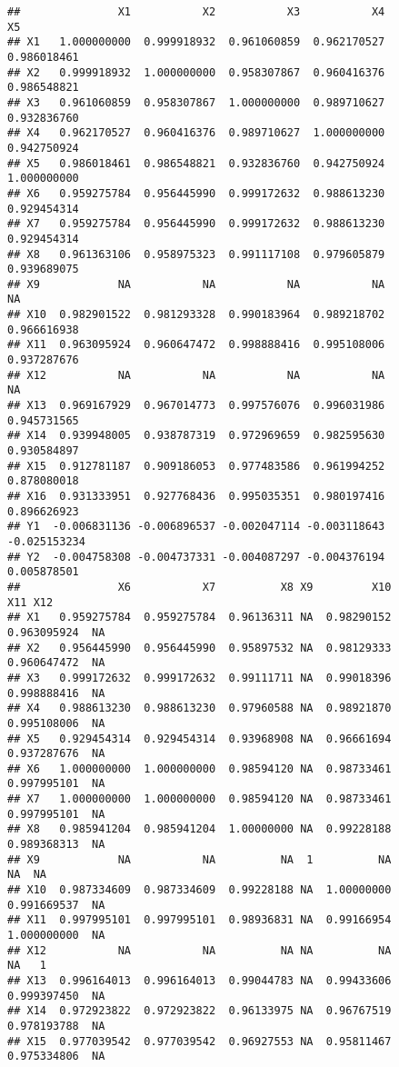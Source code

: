 \documentclass[
]{article}
\begin{document}
\begin{verbatim}
##               X1           X2           X3           X4           X5
## X1   1.000000000  0.999918932  0.961060859  0.962170527  0.986018461
## X2   0.999918932  1.000000000  0.958307867  0.960416376  0.986548821
## X3   0.961060859  0.958307867  1.000000000  0.989710627  0.932836760
## X4   0.962170527  0.960416376  0.989710627  1.000000000  0.942750924
## X5   0.986018461  0.986548821  0.932836760  0.942750924  1.000000000
## X6   0.959275784  0.956445990  0.999172632  0.988613230  0.929454314
## X7   0.959275784  0.956445990  0.999172632  0.988613230  0.929454314
## X8   0.961363106  0.958975323  0.991117108  0.979605879  0.939689075
## X9            NA           NA           NA           NA           NA
## X10  0.982901522  0.981293328  0.990183964  0.989218702  0.966616938
## X11  0.963095924  0.960647472  0.998888416  0.995108006  0.937287676
## X12           NA           NA           NA           NA           NA
## X13  0.969167929  0.967014773  0.997576076  0.996031986  0.945731565
## X14  0.939948005  0.938787319  0.972969659  0.982595630  0.930584897
## X15  0.912781187  0.909186053  0.977483586  0.961994252  0.878080018
## X16  0.931333951  0.927768436  0.995035351  0.980197416  0.896626923
## Y1  -0.006831136 -0.006896537 -0.002047114 -0.003118643 -0.025153234
## Y2  -0.004758308 -0.004737331 -0.004087297 -0.004376194  0.005878501
##               X6           X7          X8 X9         X10          X11 X12
## X1   0.959275784  0.959275784  0.96136311 NA  0.98290152  0.963095924  NA
## X2   0.956445990  0.956445990  0.95897532 NA  0.98129333  0.960647472  NA
## X3   0.999172632  0.999172632  0.99111711 NA  0.99018396  0.998888416  NA
## X4   0.988613230  0.988613230  0.97960588 NA  0.98921870  0.995108006  NA
## X5   0.929454314  0.929454314  0.93968908 NA  0.96661694  0.937287676  NA
## X6   1.000000000  1.000000000  0.98594120 NA  0.98733461  0.997995101  NA
## X7   1.000000000  1.000000000  0.98594120 NA  0.98733461  0.997995101  NA
## X8   0.985941204  0.985941204  1.00000000 NA  0.99228188  0.989368313  NA
## X9            NA           NA          NA  1          NA           NA  NA
## X10  0.987334609  0.987334609  0.99228188 NA  1.00000000  0.991669537  NA
## X11  0.997995101  0.997995101  0.98936831 NA  0.99166954  1.000000000  NA
## X12           NA           NA          NA NA          NA           NA   1
## X13  0.996164013  0.996164013  0.99044783 NA  0.99433606  0.999397450  NA
## X14  0.972923822  0.972923822  0.96133975 NA  0.96767519  0.978193788  NA
## X15  0.977039542  0.977039542  0.96927553 NA  0.95811467  0.975334806  NA

\end{verbatim}
\end{document}

